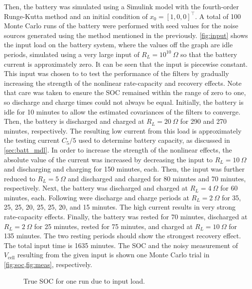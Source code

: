 \documentclass[../zhang_thesis.tex]{subfiles}
\begin{document}
Then, the battery was simulated using a Simulink model with the fourth-order Runge-Kutta method and an initial condition of $x_0=[1,0,0]^\top$. A total of 100 Monte Carlo runs of the battery were performed with seed values for the noise sources generated using the method mentioned in the previously. \cref{fig:input} shows the input load on the battery system, where the values off the graph are idle periods, simulated using a very large input of $R_L=10^{10}~\Omega$ so that the battery
current is approximately zero. It can be seen that the input is piecewise constant. This input was chosen to to test the performance of the filters by gradually increasing the strength of the nonlinear rate-capacity and recovery effects. Note that care was taken to ensure the SOC remained within the range of zero to one, so discharge and charge times could not always be equal. Initially, the battery is idle for 10 minutes to allow the estimated covariances of the filters to converge. Then, the
battery is discharged and charged at $R_L=20~\Omega$ for 290 and 270 minutes, respectively. The resulting low current from this load is approximately the testing current $C_5/5$ used to determine battery capacity, as discussed in \cref{sec:batt_mdl}. In order to increase the strength of the nonlinear effects, the absolute value of the current was increased by decreasing the input to $R_L=10~\Omega$ and discharging and charging for 150 minutes, each. Then, the input was further reduced to
$R_L=5~\Omega$ and discharged and charged for 80 minutes and 70 minutes, respectively. Next, the battery was discharged and charged at $R_L=4~\Omega$ for 60 minutes, each. Following were discharge and charge periods at $R_L=2~\Omega$ for 35, 25, 25, 20, 25, 25, 20, and 15 minutes. The high current results in very strong rate-capacity effects. Finally, the battery was rested for 70 minutes, discharged at $R_L=2~\Omega$ for 25 minutes, rested for 75 minutes, and charged at $R_L=10~\Omega$
for 135 minutes. The two resting periods should show the strongest recovery effect. The total input time is 1635 minutes. The SOC and the noisy measurement of $V_\text{cell}$ resulting from the given input is shown one Monte Carlo trial in \cref{fig:soc,fig:meas}, respectively.

\begin{figure}[htb]
\centering
%
\caption{True SOC for one run due to input load.}
\label{fig:soc}
\end{figure}
\end{document}
